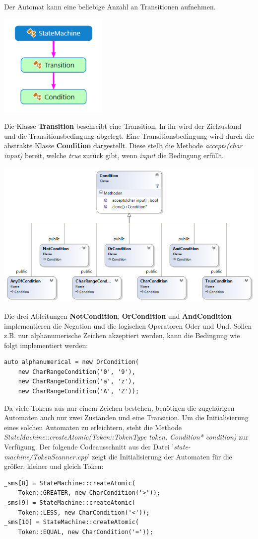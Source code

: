 \documentclass[
a4paper
]{scrreprt}
\begin{document}
	Der Automat kann eine beliebige Anzahl an Transitionen aufnehmen.  
	\begin{center}		
		\includegraphics{./images/statemachine_dependency.png}
	\end{center}
	Die Klasse \textbf{Transition} beschreibt eine Transition. In ihr wird der Zielzustand und die Transitionsbedingung abgelegt. Eine Transitionsbedingung wird durch die abstrakte Klasse \textbf{Condition} dargestellt. Diese stellt die Methode \textit{accepts(char input)} bereit, welche \textit{true} zurück gibt, wenn \textit{input} die Bedingung erfüllt.
	\begin{center}		
		\includegraphics[width=\linewidth]{./images/condition_cd.png}
	\end{center}
	Die drei Ableitungen \textbf{NotCondition}, \textbf{OrCondition} und \textbf{AndCondition} implementieren die Negation und die logischen Operatoren Oder und Und. Sollen z.B. nur alphanumerische Zeichen akzeptiert werden, kann die Bedingung wie folgt implementiert werden:	 
	\begin{lstlisting}
auto alphanumerical = new OrCondition(
	new CharRangeCondition('0', '9'),
	new CharRangeCondition('a', 'z'), 
	new CharRangeCondition('A', 'Z'));
	\end{lstlisting}
	Da viele Tokens aus nur einem Zeichen bestehen, benötigen die zugehörigen Automaten auch nur zwei Zuständen und eine Transition. Um die Initialisierung eines solchen Automaten zu erleichtern, steht die Methode \textit{StateMachine::createAtomic(Token::TokenType token, Condition* condition)} zur Verfügung. Der folgende Codeausschnitt aus der Datei '\textit{state-machine/TokenScanner.cpp}' zeigt die Initialisierung der Automaten für die größer, kleiner und gleich Token:
	\begin{lstlisting}
_sms[8] = StateMachine::createAtomic(
	Token::GREATER, new CharCondition('>'));
_sms[9] = StateMachine::createAtomic(
	Token::LESS, new CharCondition('<'));
_sms[10] = StateMachine::createAtomic(
	Token::EQUAL, new CharCondition('='));
	\end{lstlisting}
	
\end{document}
